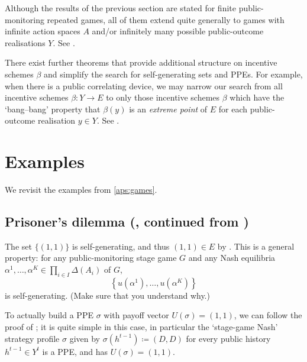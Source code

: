 Although the results of the previous section are stated for finite public-monitoring repeated games, all of them extend quite generally to games with infinite action spaces $A$ and/or infinitely many possible public-outcome realisations $Y$. See \textcite[][chapter~7]{MailathSamuelson2006}.

There exist further theorems that provide additional structure on incentive schemes $\beta$ and simplify the search for self-generating sets and PPEs. For example, when there is a public correlating device, we may narrow our search from all incentive schemes $\beta : Y \to E$ to only those incentive schemes $\beta$ which have the `bang--bang' property that $\beta(y)$ is an \emph{extreme point} of $E$ for each public-outcome realisation $y \in Y$. See \textcite[section~7.5]{MailathSamuelson2006}.



\section{Examples}
\label{aps:examples}

We revisit the examples from \cref{aps:games}.



\subsection{\texorpdfstring{Prisoner's dilemma (, continued from )}{Prisoner's dilemma  (Example \ref{example:rep_pris}, continued from p. \pageref{example:rep_pris})}}
\label{aps:examples:rep_pris_gen}

The set $\{ (1,1) \}$ is self-generating, and thus $(1,1) \in E$ by . This is a general property: for any public-monitoring stage game $G$ and any Nash equilibria $\alpha^1,\dots,\alpha^K \in \prod_{i \in I} \Delta(A_i)$ of $G$,
%
\begin{equation*}
	\left\{ u\left(\alpha^1\right), \dots, u\left(\alpha^K\right) \right\}
\end{equation*}
%
is self-generating. (Make sure that you understand why.)

To actually build a PPE $\sigma$ with payoff vector $U(\sigma)=(1,1)$, we can follow the proof of ; it is quite simple in this case, in particular the `stage-game Nash' strategy profile $\sigma$ given by $\sigma\left(h^{t-1}\right) \coloneqq (D,D)$ for every public history $h^{t-1} \in Y^t$ is a PPE, and has $U(\sigma)=(1,1)$.

